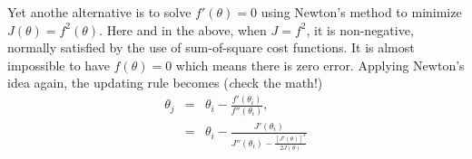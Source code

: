 Yet anothe alternative is to solve $f'(\theta)=0$ using Newton's method to minimize $J(\theta)=f^2(\theta)$. Here and in the above, when $J=f^2$, it is non-negative, normally satisfied by the use of sum-of-square cost functions. It is almost impossible to have $f(\theta)=0$ which means there is zero error. Applying Newton's idea again, the updating rule becomes (\emph check the math!)
\begin{eqnarray}
\theta_j &=& \theta_i - \frac{f'(\theta_i)}{f''(\theta_i)},\\
	 &=& \theta_i - \frac{J'(\theta_i)}{J''(\theta_i)-\frac{[J'(\theta)]^2}{2J(\theta)}}
\end{eqnarray}
